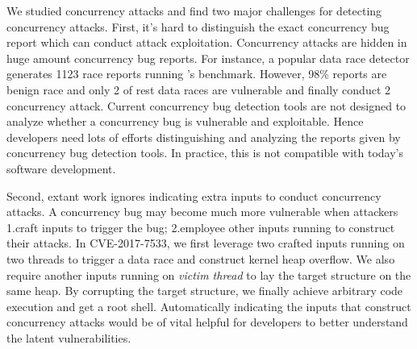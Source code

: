 We studied \nattacks concurrency attacks and find two major challenges for detecting concurrency attacks. 
First, it's hard to distinguish the exact concurrency bug report which can conduct attack exploitation. 
Concurrency attacks are hidden in huge amount concurrency bug reports. 
For instance, a popular data race detector \tsan generates 1123 
race reports running \mysql's benchmark. However, 98\% reports are benign race 
and only 2 of rest data races are vulnerable and finally conduct 2 concurrency attack. 
Current concurrency bug detection tools are not designed to  
analyze whether a concurrency bug is vulnerable and exploitable. 
Hence developers need lots of efforts distinguishing and analyzing the reports given by concurrency bug detection tools. 
In practice, this is not compatible with today's software development. 
%


Second, extant work ignores indicating extra inputs to conduct concurrency attacks.
A concurrency bug may become much more vulnerable when attackers 1.craft inputs to trigger the bug; 
2.employee other inputs running to construct their attacks. 
In CVE-2017-7533, we first leverage two crafted inputs running on two threads to trigger a data race and construct kernel heap overflow. 
We also require another inputs running on \emph{victim thread} to lay the target structure on the same heap. 
By corrupting the target structure, we finally achieve arbitrary code execution and get a root shell. 
Automatically indicating the inputs that construct concurrency attacks 
would be of vital helpful for developers to better understand the latent vulnerabilities.

